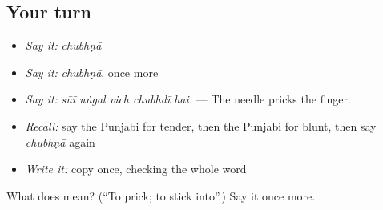 \subsection*{Your turn}
\begin{itemize}
\raggedright
  \item \emph{Say it:} \emph{chubhṇā}
  \item \emph{Say it:} \emph{chubhṇā}, once more
  \item \emph{Say it:} \emph{sūī uṅgal vich chubhdī hai.} — The needle pricks the finger.
  \item \emph{Recall:} say the Punjabi for tender, then the Punjabi for blunt, then say \emph{chubhṇā} again
  \item \emph{Write it:} copy \textbf{} once, checking the whole word
\end{itemize}

\begin{tcolorbox}[breakable,colback=teal!4,colframe=teal!35!black,title={Before you move on}]
What does  mean? (\textquotedblleft{}To prick; to stick into\textquotedblright{}.) Say it once more.
\end{tcolorbox}
